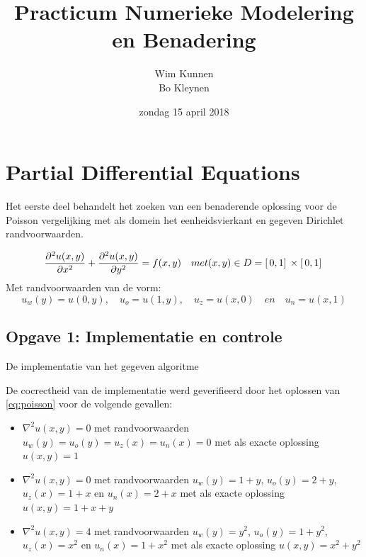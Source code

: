 \documentclass[a4paper]{article}
\title{Practicum Numerieke Modelering en Benadering}
\author{Wim Kunnen \\ Bo Kleynen}
\date{zondag 15 april 2018 }
\newcommand{\opgave}[1]{\subsection{Opgave #1}}
\begin{document}
\begin{titlepage}
\maketitle
\thispagestyle{empty}
\end{titlepage}


\setcounter{page}{1}
\tableofcontents
\cleardoublepage

\listoffigures
{}

\listoftables
{}

\lstlistoflistings

\cleardoublepage



\setcounter{page}{1}

\section{Partial Differential Equations}\label{sec:PDE}
Het eerste deel behandelt het zoeken van een benaderende oplossing voor de Poisson vergelijking met als domein het eenheidsvierkant en gegeven Dirichlet randvoorwaarden.

\begin{equation}\label{eq:poisson}
	\pdv[2]{u(x,y)}{x} + \pdv[2]{u(x,y)}{y} = f(x,y) \quad met (x,y) \in D = [ \, 0,1 ]\, \times [ \, 0,1 ]\,
\end{equation}
Met randvoorwaarden van de vorm:
\begin{equation}\nonumber
	u_w(y) = u(0,y), \quad u_o = u(1,y), \quad u_z = u(x,0) \quad en \quad u_n = u(x,1)
\end{equation}



\opgave{1: Implementatie en controle}\label{sec:oef1}
De implementatie van het gegeven algoritme

De cocrectheid van de implementatie werd geverifieerd door het oplossen van \ref{eq:poisson} voor de volgende gevallen:
\begin{itemize}
	\item $\nabla^2u(x,y)=0$ met randvoorwaarden $u_w(y)=u_o(y)=u_z(x)=u_n(x)=0$ met als exacte oplossing $u(x,y) = 1$
	\item $\nabla^2u(x,y)=0$ met randvoorwaarden $u_w(y)=1+y$, $u_o(y)=2+y$, $u_z(x)=1+x$ en $u_n(x)=2+x$ met als exacte oplossing $u(x,y) = 1 + x + y$
	\item $\nabla^2u(x,y)=4$ met randvoorwaarden $u_w(y)=y^2$, $u_o(y)=1+y^2$, $u_z(x)=x^2$ en $u_n(x)=1+x^2$ met als exacte oplossing $u(x,y) = x^2 +y^2$
\end{itemize}
\end{document}
